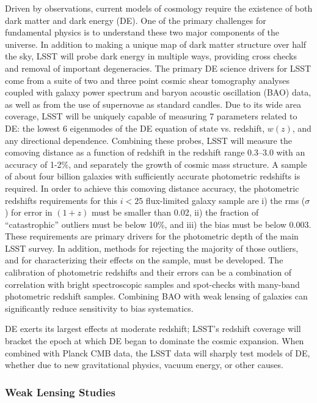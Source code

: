 Driven by observations, current models of cosmology require the existence
of both dark matter and dark energy (DE). One of the primary challenges for
fundamental physics is to understand these two major components of the
universe. In addition to making a unique map of dark matter structure over
half the sky, LSST will probe dark energy in multiple ways, providing cross
checks and removal of important degeneracies.
The primary DE science drivers for LSST come from a suite of two
and three point cosmic shear tomography analyses coupled with galaxy power
spectrum and baryon acoustic oscillation (BAO) data, as well as from the
use of supernovae as standard candles. Due to its wide area coverage, LSST
will be uniquely capable of measuring 7 parameters related to DE:
the lowest 6 eigenmodes of the DE equation of state vs. redshift, $w(z)$, and
any directional dependence.
Combining these probes, LSST will measure the comoving distance as a function
of redshift in the redshift range 0.3--3.0 with an accuracy of 1-2\%, and
separately the growth of cosmic mass structure.
A sample of about four billion galaxies with sufficiently accurate photometric
redshifts is required. In order to achieve this comoving distance accuracy,
the photometric redshifts requirements for this $i<25$
flux-limited galaxy sample are i) the rms ($\sigma$) for error in $(1+z)$ must be
smaller than 0.02, ii) the fraction of ``catastrophic'' outliers
must be below 10\%, and iii) the bias must be below 0.003. These requirements are
primary drivers for the photometric depth of the main LSST survey. In addition,
methods for rejecting the majority of those outliers, and for characterizing their
effects on the sample, must be developed. The calibration of photometric redshifts
and their errors can be a combination of correlation with bright spectroscopic samples
and spot-checks with many-band photometric redshift samples. Combining BAO with
weak lensing of galaxies can significantly reduce sensitivity to bias systematics.

DE exerts its largest effects at moderate
redshift; LSST's redshift coverage will bracket the epoch at which DE began
to dominate the cosmic expansion. When combined with Planck CMB data, the
LSST data will sharply test models of DE, whether due to new
gravitational physics, vacuum energy, or other causes.




\subsubsection{Weak Lensing Studies}
\label{WLstudies}

